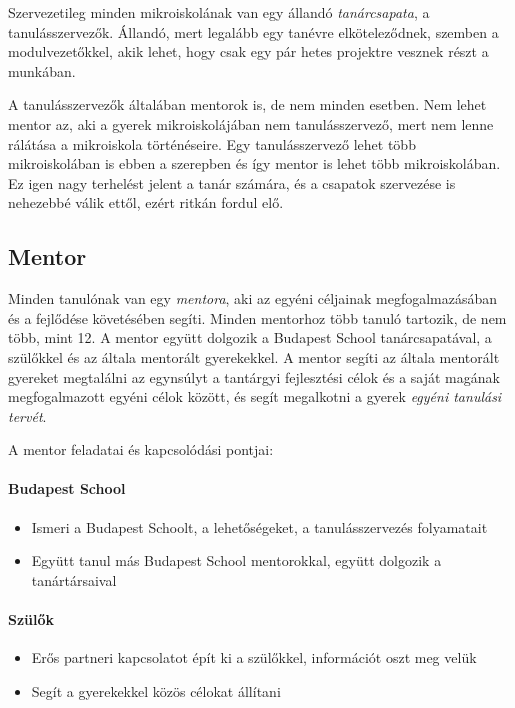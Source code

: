 Szervezetileg minden mikroiskolának van egy állandó \emph{tanárcsapata}, a tanulásszervezők. Állandó, mert legalább egy tanévre elköteleződnek, szemben a modulvezetőkkel, akik lehet, hogy csak egy pár hetes projektre vesznek részt a munkában.

A tanulásszervezők általában mentorok is, de nem minden esetben. Nem lehet mentor az, aki a gyerek mikroiskolájában nem tanulásszervező, mert nem lenne rálátása a mikroiskola történéseire. Egy tanulásszervező lehet több mikroiskolában is ebben a szerepben és így mentor is lehet több mikroiskolában. Ez igen nagy terhelést jelent a tanár számára, és a csapatok szervezése is nehezebbé válik ettől, ezért ritkán fordul elő.



\subsection{Mentor}
  Minden tanulónak van egy \emph{mentora}, aki az egyéni céljainak megfogalmazásában és
  a fejlődése követésében segíti. Minden mentorhoz több tanuló tartozik, de nem
  több, mint 12. A mentor együtt dolgozik a Budapest School tanárcsapatával, a
  szülőkkel és az általa mentorált gyerekekkel. A mentor segíti az általa
  mentorált gyereket megtalálni az egynsúlyt a tantárgyi fejlesztési célok és a
  saját magának megfogalmazott egyéni célok között, és segít megalkotni a gyerek \emph{egyéni
  tanulási tervét}.

  A mentor feladatai és kapcsolódási pontjai:

  \paragraph{Budapest School}
  \begin{itemize}
    \item Ismeri a Budapest Schoolt, a lehetőségeket, a tanulásszervezés folyamatait
    \item Együtt tanul más Budapest School mentorokkal, együtt dolgozik a tanártársaival
  \end{itemize}

  \paragraph{Szülők}
  \begin{itemize}
    \item Erős partneri kapcsolatot épít ki a szülőkkel, információt oszt meg velük
    \item Segít a gyerekekkel közös célokat állítani
\end{itemize}

